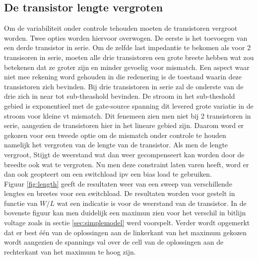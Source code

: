 \subsection{De transistor lengte vergroten}\label{sec:finaleload}
Om de variabiliteit onder controle tehouden moeten de transistoren vergroot worden. Twee opties worden hiervoor overwogen. De eerste is het toevoegen van een derde transistor in serie. Om de zelfde last impedantie te bekomen als voor 2 transisoren in serie, moeten alle drie transistoren een grote breete hebben wat zou betekenen dat ze groter zijn en minder gevoelig voor mismatch. Een aspect waar niet mee rekening word gehouden in die redenering is de toestand waarin deze transistoren zich bevinden. Bij drie transistoren in serie zal de onderste van de drie zich in near tot sub-theashold bevinden. De stroom in het sub-theshold gebied is exponentieel met de gate-source spanning dit levered grote variatie in de stroom voor kleine vt mismatch. Dit fenemeen zien men niet bij 2 transistoren in serie, aangezien de transistoren hier in het lineare gebied zijn. Daarom word er gekozen voor een tweede optie om de mismatch onder controle te houden namelijk het vergroten van de lengte van de transistor. Als men de lengte vergroot, Stijgt de weerstand wat dan weer gecompenseert kan worden door de breedte ook wat te vergroten. Nu men deze constraint laten varen heeft, word er dan ook geopteert om een switchload ipv een bias load te gebruiken.\\
Figuur \ref{fig:length} geeft de resultaten weer van een sweep van verschillende lengtes en breetes voor een switchload. De resultaten worden voor gestelt in functie van $W/L$ wat een indicatie is voor de weerstand van de transistor. In de bovenste figuur kan men duidelijk een maximun zien voor het verschil in bitlijn voltage zoals in sectie \ref{sec:simplemodel} werd voorspelt. Verder wordt opgemerkt dat er best \'{e}\'{e}n van de oplossingen aan de linkerkant van het maximum gekozen wordt aangezien de spannings val over de cell van de oplossingen aan de rechterkant van het maximum te hoog zijn.
